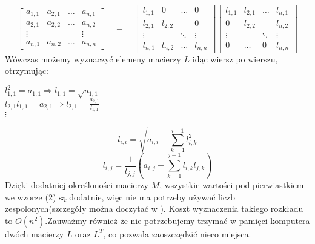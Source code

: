 \documentclass[11pt,wide]{article}
\begin{document}
\[
 \left[
        \begin{array}{cccc}
         	a_{1,1} & a_{2,1} & \ldots & a_{n,1}\\
  			a_{2,1} & a_{2,2} & \ldots & a_{n,2} \\
  			\vdots &  & & \vdots\\
  			a_{n,1} & a_{n,2} & \ldots & a_{n,n} 
         \end{array}
    \right]
      \quad
 = \quad \left[
       \begin{array}{cccc}
          l_{1,1} & 0 & \ldots & 0\\
          l_{2,1} & l_{2,2} & & 0 \\
          \vdots &  & \ddots & \vdots\\ 
          l_{n,1} & l_{n,2} & \ldots & l_{n,n}
       \end{array}
     \right]
	 \left[
       \begin{array}{cccc}
          l_{1,1} & l_{2,1} & \ldots & l_{n,1}\\
          0 & l_{2,2} &  & l_{n,2} \\
          \vdots &  & \ddots & \vdots\\ 
          0 & \ldots & 0 & l_{n,n}
       \end{array}
     \right]
\]
\noindent
Wówczas możemy wyznaczyć elemeny macierzy $L$ idąc wiersz po wierszu, otrzymując:
\begin{center}
$l_{1,1}^2 = a_{1,1} \Rightarrow l_{1,1} = \sqrt{a_{1,1}}$ \\
$ l_{2,1}l_{1,1} = a_{2,1} \Rightarrow l_{2,1} = \frac{a_{2,1}}{l_{1,1}}$ \\
$\vdots$ 
\end{center}
\begin{equation}
l_{i,i} = \sqrt{a_{i,i} - \displaystyle\sum_{k=1}^{i-1}l_{i,k}^2}
\end{equation}
\begin{equation}
l_{i,j} = \frac{1}{l_{j,j}} (a_{i,j} - \displaystyle\sum_{k=1}^{j-1} l_{i,k}l_{j,k})
\end{equation}
Dzięki dodatniej określoności macierzy $M$, wszystkie wartości pod pierwiastkiem we wzorze (2) są dodatnie, więc nie ma potrzeby używać liczb zespolonych(szczegóły można doczytać w \cite{kincaid}).\newline
Koszt wyznaczenia takiego rozkładu to $O(n^2)$.Zauważmy również że nie potrzebujemy trzymać w pamięci komputera dwóch macierzy $L$ oraz $L^T$, co pozwala zaoszczędzić nieco miejsca.
\end{document}
